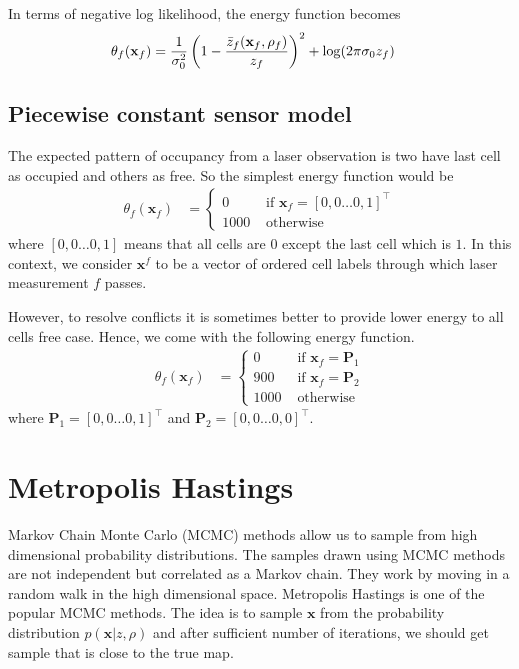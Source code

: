 \documentclass[letterpaper, 10 pt, conference]{ieeeconf} %
\newcommand{\vect}[1]{\mathbf{#1}}
\begin{document}
In terms of negative log likelihood, the energy function becomes
\begin{align}
  \theta_f(\vect{x}_f) &= \frac{1}{\sigma_0^2}\left(1 - \frac{\actz}{z_f}\right)^2 + \log(2\pi\sigma_0z_f)
\end{align}

\subsection{Piecewise constant sensor model}
The expected pattern of occupancy from a laser observation is two have last cell as occupied and others as free. So the simplest energy function would be 
\begin{align}
  \theta_f(\vect{x}_f) &= \begin{cases}
              0 & \text{ if } \vect{x}_f = [0, 0 \dots 0, 1]^\top\\
           1000 & \text{ otherwise}
  \end{cases}
\end{align}
where $[0, 0 \dots 0, 1]$ means that all cells are $0$ except the last cell which is $1$. In this context, we consider $\vect{x}^f$ to be a vector of ordered cell labels through which laser measurement $f$ passes.

However, to resolve conflicts it is sometimes better to provide lower energy to all cells free case. Hence, we come with the following energy function.
\begin{align}
  \theta_f(\vect{x}_f) &= \begin{cases}
                     0 & \text{ if } \vect{x}_f = \vect{P}_1\\
                   900 & \text{ if } \vect{x}_f = \vect{P}_2\\
                  1000 & \text{ otherwise}
  \end{cases}
\end{align}
where $\vect{P}_1 = [0, 0 \dots 0, 1]^\top$ and $\vect{P}_2 = [0, 0 \dots 0, 0]^\top$.
\section{Metropolis Hastings}
Markov Chain Monte Carlo (MCMC) methods allow us to sample from high dimensional probability distributions. The samples drawn using MCMC methods are not independent but correlated as a Markov chain. They work by moving in a random walk in the high dimensional space. Metropolis Hastings is one of the popular MCMC methods. The idea is to sample $\vect{x}$ from the probability distribution $p(\vect{x}|z, \rho)$ and after sufficient number of iterations, we should get sample that is close to the true map.
\end{document}
